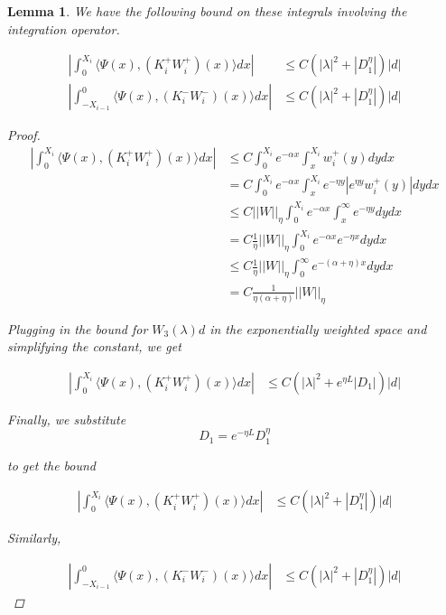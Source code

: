\documentclass[12pt]{article}
\newtheorem{lemma}{Lemma}
\begin{document}
\begin{lemma}
We have the following bound on these integrals involving the integration operator.

\begin{align*}
\left| \int_0^{X_i} \langle \Psi(x), (K_i^+ W_i^+)(x)\rangle dx \right| &\leq C \left( |\lambda|^2 + |D_1^\eta|\right)|d| \\
\left| \int_{-X_{i-1}}^0 \langle \Psi(x), (K_i^- W_i^-)(x)\rangle dx \right| &\leq C \left( |\lambda|^2 + |D_1^\eta|\right)|d|
\end{align*}

\begin{proof}

\begin{align*}
\left| \int_0^{X_i} \langle \Psi(x), (K_i^+ W_i^+)(x)\rangle dx \right| &\leq C \int_0^{X_i} e^{-\alpha x} \int_x^{X_i} w_i^+(y) dy dx \\
&= C \int_0^{X_i} e^{-\alpha x} \int_x^{X_i} e^{-\eta y} |e^{\eta y} w_i^+(y)| dy dx\\
&\leq C ||W||_\eta \int_0^{X_i} e^{-\alpha x} \int_x^{\infty} e^{-\eta y} dy dx \\
&= C \frac{1}{\eta} ||W||_\eta \int_0^{X_i} e^{-\alpha x} e^{-\eta x} dy dx \\
&\leq C \frac{1}{\eta} ||W||_\eta \int_0^{\infty} e^{-(\alpha + \eta) x} dy dx \\
&= C \frac{1}{\eta(\alpha + \eta)} ||W||_\eta 
\end{align*}

Plugging in the bound for $W_3(\lambda)d$ in the exponentially weighted space and simplifying the constant, we get

\begin{align*}
\left| \int_0^{X_i} \langle \Psi(x), (K_i^+ W_i^+)(x)\rangle dx \right| &\leq C  \left( |\lambda|^2 + e^{\eta L}|D_1|\right)|d|
\end{align*}

Finally, we substitute 
\[
D_1 = e^{-\eta L} D_1^{\eta}
\]

to get the bound

\begin{align*}
\left| \int_0^{X_i} \langle \Psi(x), (K_i^+ W_i^+)(x)\rangle dx \right| &\leq C  \left( |\lambda|^2 + |D_1^\eta|\right)|d|
\end{align*}

Similarly, 

\begin{align*}
\left| \int_{-X_{i-1}}^0 \langle \Psi(x), (K_i^- W_i^-)(x)\rangle dx \right| &\leq C  \left( |\lambda|^2 + |D_1^\eta|\right)|d|
\end{align*}


\end{proof}
\end{lemma}
\end{document}
